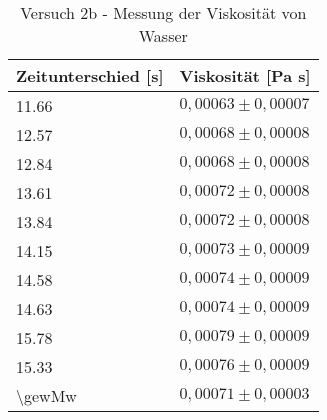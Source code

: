 \begin{table}[!h]
\centering
\begin{tabular}{|l|l|}
 \hline
Zeitunterschied [s] & Viskosität [Pa s]\\
\hline
\num{11,66} & $0,00063 \pm 0,00007$\\
\hline
\num{12,57} & $0,00068 \pm 0,00008$\\
\hline
\num{12,84} & $0,00068 \pm 0,00008$\\
\hline
\num{13,61} & $0,00072 \pm 0,00008$\\
\hline
\num{13,84} & $0,00072 \pm 0,00008$\\
\hline
\num{14,15} & $0,00073 \pm 0,00009$\\
\hline
\num{14,58} & $0,00074 \pm 0,00009$\\
\hline
\num{14,63} & $0,00074 \pm 0,00009$\\
\hline
\num{15,78} & $0,00079 \pm 0,00009$\\
\hline
\num{15,33} & $0,00076 \pm 0,00009$\\
\hline
\num{\gewMw} & $0,00071 \pm 0,00003$\\

 \hline
\end{tabular}
\caption{Versuch 2b - Messung der Viskosität von Wasser}\label{tbl:visko2b}\end{table}